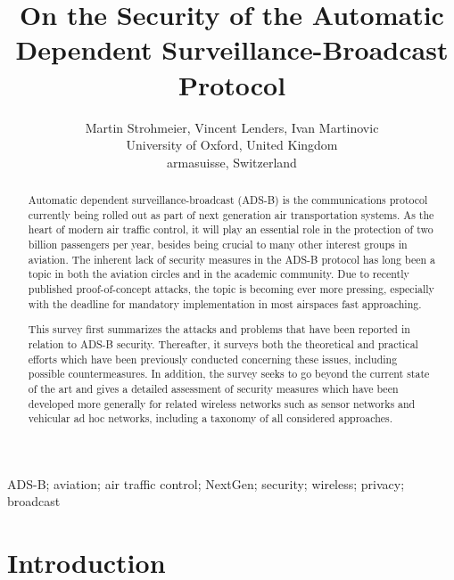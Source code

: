 \documentclass[english]{IEEEtran}
\begin{document}
\title{On the Security of the Automatic Dependent Surveillance-Broadcast
Protocol}


\author{Martin Strohmeier, Vincent Lenders, Ivan Martinovic\\
University of Oxford, United Kingdom\\
armasuisse, Switzerland}
\maketitle
\begin{abstract}
Automatic dependent surveillance-broadcast (ADS-B) is the communications
protocol currently being rolled out as part of next generation air
transportation systems. As the heart of modern air traffic control,
it will play an essential role in the protection of two billion passengers
per year, besides being crucial to many other interest groups in aviation.
The inherent lack of security measures in the ADS-B protocol has long
been a topic in both the aviation circles and in the academic community.
Due to recently published proof-of-concept attacks, the topic is becoming
ever more pressing, especially with the deadline for mandatory implementation
in most airspaces fast approaching. 

This survey first summarizes the attacks and problems that have been
reported in relation to ADS-B security. Thereafter, it surveys both
the theoretical and practical efforts which have been previously conducted
concerning these issues, including possible countermeasures. In addition,
the survey seeks to go beyond the current state of the art and gives
a detailed assessment of security measures which have been developed
more generally for related wireless networks such as sensor networks
and vehicular ad hoc networks, including a taxonomy of all considered
approaches.\end{abstract}
\begin{IEEEkeywords}
ADS-B; aviation; air traffic control; NextGen; security; wireless;
privacy; broadcast
\end{IEEEkeywords}

\section{Introduction}
\end{document}
